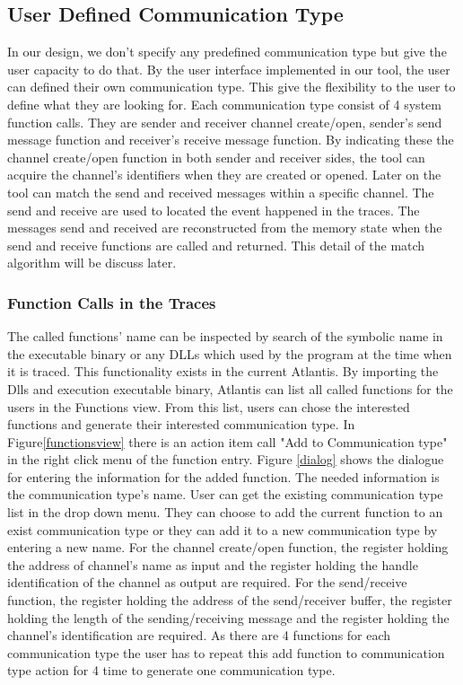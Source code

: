 \documentclass[paper=a4, fontsize=11pt]{scrartcl}
\numberwithin{equation}{section}		%
\numberwithin{figure}{section}			%
\numberwithin{table}{section}				%
\begin{document}
\subsection{User Defined Communication Type}
In our design, we don't specify any predefined communication type but give the user capacity to do that. By the user interface implemented in our tool, the user can defined their own communication type. This give the flexibility to the user to define what they are looking for. Each communication type consist of 4 system function calls. They are sender and receiver channel create/open, sender's send message function and receiver's receive message function. By indicating these the channel create/open function in both sender and receiver sides, the tool can acquire the channel's identifiers when they are created or opened. Later on the tool can match the send and received messages within a specific channel. The send and receive are used to located the event happened in the traces. The messages send and received are reconstructed from the memory state when the send and receive functions are called and returned. This detail of the match algorithm will be discuss later.

\subsubsection{Function Calls in the Traces}
The called functions' name can be inspected  by  search of the symbolic name in the executable binary or any DLLs which used by the program at the time when it is traced. This functionality exists in the current Atlantis. By importing the Dlls and execution  executable binary, Atlantis can list all called functions for the users in the Functions view. From this list, users can chose the interested functions and generate their interested communication type. In Figure\ref{functionsview} there is  an action item call "Add to Communication type" in the right click menu of the function entry. Figure \ref{dialog} shows the dialogue for entering the information for the added function. The needed information is the communication type's name. User can get the existing communication type list in the drop down menu. They can choose to add the current function to an exist communication type or they can add it to a new communication type by entering a new name. For the channel create/open function, the register holding the address of channel's name as input and the register holding the handle identification of the channel as output are required. For the send/receive function, the register holding the address of the send/receiver buffer, the register holding the length of the sending/receiving message and the register holding the channel's identification are required. As there are 4 functions for each communication type the user has to repeat this add function to communication type action for 4 time to generate one communication type.
\end{document}

